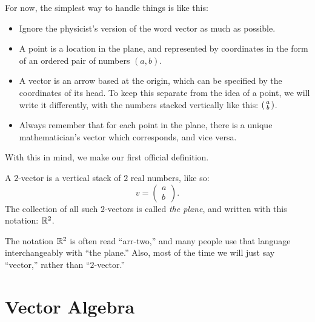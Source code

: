 \documentclass[00-livre-main.tex]{subfiles}
\begin{document}
For now, the simplest way to handle things is like this:
\begin{itemize}
\item Ignore the physicist's version of the word vector as much as possible.
\item A point is a location in the plane, and represented by coordinates in the form of an ordered pair of numbers $(a,b)$.
\item A vector is an arrow based at the origin, which can be specified by the coordinates of its head. To keep this separate from the idea of a point, we will write it differently, with the numbers stacked vertically like this: $\left(\begin{smallmatrix} a \\ b \end{smallmatrix}\right)$.
\item Always remember that for each point in the plane, there is a unique mathematician's vector which corresponds, and vice versa.
\end{itemize}
With this in mind, we make our first official definition.

\begin{definition} A $2$-vector is a vertical stack of $2$ real numbers, like so:
\[
v = \begin{pmatrix} a \\ b \end{pmatrix}.
\]
The collection of all such $2$-vectors is called \emph{the plane}, and written with this notation: $\mathbb{R}^2$.
\end{definition}

The notation $\mathbb{R}^2$ is often read ``arr-two,'' and many people use that language interchangeably with ``the plane.'' Also, most of the time we will just say ``vector,'' rather than ``$2$-vector.'' 

\section*{Vector Algebra}
\end{document}

